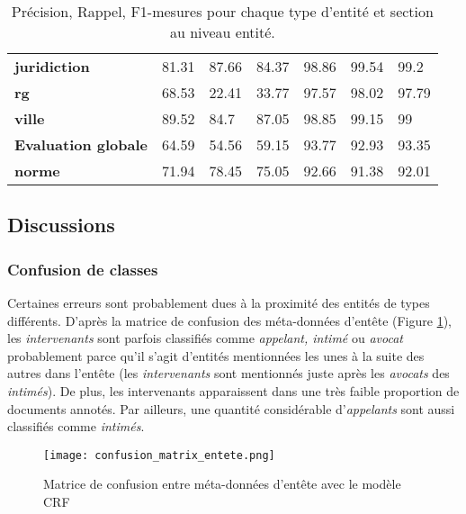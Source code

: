 \begin{table}[!h]
\begin{tabular}{|l|l|l|l|l|l|l|}
		\textbf{juridiction}   & 81.31              & 87.66           & 84.37       & 98.86              & 99.54           & 99.2        \\ 
		\textbf{rg}            & 68.53              & 22.41           & 33.77       & 97.57              & 98.02           & 97.79       \\ 
		\textbf{ville}         & 89.52              & 84.7            & 87.05       & 98.85              & 99.15           & 99          \\ \hline
		\textbf{Evaluation globale} & 64.59              & 54.56           & 59.15       & 93.77              & 92.93           & 93.35       \\ \hline
				\noalign{\smallskip}\hline\noalign{\smallskip}
		\textbf{norme}         & 71.94              & 78.45           & 75.05       & 92.66              & 91.38           & 92.01       \\ \hline
	\end{tabular}
	\caption{Précision, Rappel, F1-mesures pour chaque type d'entité et section au niveau entité.}\label{tab:structuration:perf-detail-entity}
\end{table}

\subsection{Discussions}
\subsubsection{Confusion de classes}
Certaines erreurs sont probablement dues à la proximité des entités de types différents. D'après la matrice de confusion des méta-données d'entête (Figure \ref{fig:structuration:matrice-confusion-entete}), les \textit{intervenants} sont parfois classifiés comme \textit{appelant, intimé} ou \textit{avocat} probablement parce qu'il s'agit d'entités mentionnées les unes à la suite des autres dans l'entête (les \textit{intervenants} sont mentionnés juste après les \textit{avocats} des \textit{intimés}). De plus, les intervenants apparaissent dans une très faible proportion de documents annotés.  Par ailleurs, une quantité considérable d'\textit{appelants} sont aussi classifiés comme \textit{intimés}. 

\begin{figure}[h!]
    \centering
    \texttt{[image: confusion\_matrix\_entete.png]}
    \caption{Matrice de confusion entre méta-données d'entête avec le modèle CRF}
    \label{fig:structuration:matrice-confusion-entete}
\end{figure}

